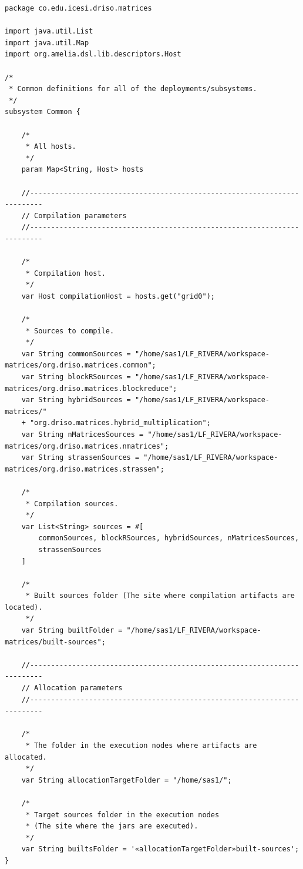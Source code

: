 \documentclass{article}
\begin{document}
\begin{lstlisting}[style=amelia,caption=Subsystem \textit{Common} for reusable definitions.]
package co.edu.icesi.driso.matrices

import java.util.List
import java.util.Map
import org.amelia.dsl.lib.descriptors.Host

/*
 * Common definitions for all of the deployments/subsystems.
 */
subsystem Common {

	/*
	 * All hosts.
	 */
	param Map<String, Host> hosts

	//-------------------------------------------------------------------------
	// Compilation parameters
	//-------------------------------------------------------------------------

	/*
	 * Compilation host.
	 */
	var Host compilationHost = hosts.get("grid0");

	/*
	 * Sources to compile.
	 */
	var String commonSources = "/home/sas1/LF_RIVERA/workspace-matrices/org.driso.matrices.common";
	var String blockRSources = "/home/sas1/LF_RIVERA/workspace-matrices/org.driso.matrices.blockreduce";
	var String hybridSources = "/home/sas1/LF_RIVERA/workspace-matrices/"
	+ "org.driso.matrices.hybrid_multiplication";
	var String nMatricesSources = "/home/sas1/LF_RIVERA/workspace-matrices/org.driso.matrices.nmatrices";
	var String strassenSources = "/home/sas1/LF_RIVERA/workspace-matrices/org.driso.matrices.strassen";

	/*
	 * Compilation sources.
	 */
	var List<String> sources = #[
        commonSources, blockRSources, hybridSources, nMatricesSources,
        strassenSources
	]

	/*
	 * Built sources folder (The site where compilation artifacts are located).
	 */
	var String builtFolder = "/home/sas1/LF_RIVERA/workspace-matrices/built-sources";

	//-------------------------------------------------------------------------
	// Allocation parameters
	//-------------------------------------------------------------------------

	/*
	 * The folder in the execution nodes where artifacts are allocated.
	 */
	var String allocationTargetFolder = "/home/sas1/";

	/*
	 * Target sources folder in the execution nodes
	 * (The site where the jars are executed).
	 */
	var String builtsFolder = '«allocationTargetFolder»built-sources';
}

\end{lstlisting}
\end{document}
